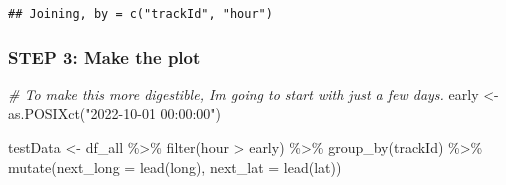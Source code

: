 \documentclass[
]{article}
\newenvironment{Shaded}{\begin{snugshade}}{\end{snugshade}}
\newcommand{\AttributeTok}[1]{\textcolor[rgb]{0.77,0.63,0.00}{#1}}
\newcommand{\CommentTok}[1]{\textcolor[rgb]{0.56,0.35,0.01}{\textit{#1}}}
\newcommand{\FunctionTok}[1]{\textcolor[rgb]{0.00,0.00,0.00}{#1}}
\newcommand{\NormalTok}[1]{#1}
\newcommand{\OtherTok}[1]{\textcolor[rgb]{0.56,0.35,0.01}{#1}}
\newcommand{\SpecialCharTok}[1]{\textcolor[rgb]{0.00,0.00,0.00}{#1}}
\newcommand{\StringTok}[1]{\textcolor[rgb]{0.31,0.60,0.02}{#1}}
\begin{document}
\begin{verbatim}
## Joining, by = c("trackId", "hour")
\end{verbatim}

\hypertarget{step-3-make-the-plot}{%
\subsubsection{STEP 3: Make the plot}\label{step-3-make-the-plot}}

\begin{Shaded}
\begin{Highlighting}[]
\CommentTok{\# To make this more digestible, I\textquotesingle{}m going to start with just a few days.}
\NormalTok{early }\OtherTok{\textless{}{-}} \FunctionTok{as.POSIXct}\NormalTok{(}\StringTok{"2022{-}10{-}01 00:00:00"}\NormalTok{)}

\NormalTok{testData }\OtherTok{\textless{}{-}}\NormalTok{ df\_all }\SpecialCharTok{\%\textgreater{}\%}
  \FunctionTok{filter}\NormalTok{(hour }\SpecialCharTok{\textgreater{}}\NormalTok{ early) }\SpecialCharTok{\%\textgreater{}\%}
  \FunctionTok{group\_by}\NormalTok{(trackId) }\SpecialCharTok{\%\textgreater{}\%}
  \FunctionTok{mutate}\NormalTok{(}\AttributeTok{next\_long =} \FunctionTok{lead}\NormalTok{(long),}
         \AttributeTok{next\_lat =} \FunctionTok{lead}\NormalTok{(lat))}


\end{Highlighting}
\end{Shaded}
\end{document}
